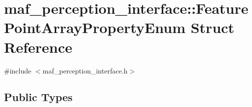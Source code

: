 \hypertarget{structmaf__perception__interface_1_1FeaturePointArrayPropertyEnum}{}\section{maf\+\_\+perception\+\_\+interface\+:\+:Feature\+Point\+Array\+Property\+Enum Struct Reference}
\label{structmaf__perception__interface_1_1FeaturePointArrayPropertyEnum}


{\ttfamily \#include $<$maf\+\_\+perception\+\_\+interface.\+h$>$}

\subsection*{Public Types}
